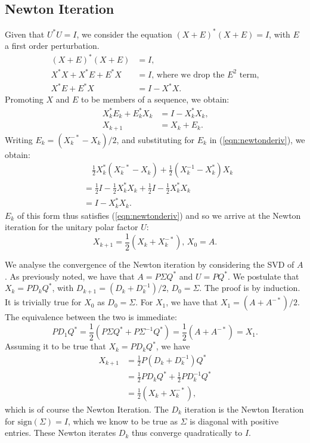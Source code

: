 \documentclass[12pt]{article}
\begin{document}
\subsection{Newton Iteration}
Given that $U^*U = I$, we consider the equation $(X+E)^*(X+E) = I$, with $E$ a
first order perturbation.
\begin{align*}
  (X+E)^*(X+E) & = I\text{, } \\
  X^*X + X^*E + E^*X & = I\text{, where we drop the } E^2 \text{ term,} \\
  X^*E + E^*X &  = I - X^*X\text{.} 
\end{align*}
Promoting $X$ and $E$ to be members of a sequence, we obtain:
\begin{align}\label{eqn:newtonderiv}
    X_k^*E_k + E_k^*X_k & = I - X_k^*X_k\text{,} \\
    X_{k+1} & = X_k + E_k\text{.}
\end{align}
Writing $E_k = (X_k^{-*} - X_k)/2$, and substituting for
$E_k$ in (\ref{eqn:newtonderiv}), we obtain:
\begin{align*}
  &\quad\frac{1}{2}X_k^*(X_k^{-*} - X_k) + \frac{1}{2}(X_k^{-1} - X_k^*)X_k \\
  &= \frac{1}{2}I - \frac{1}{2} X_k^*X_k + \frac{1}{2}I -  \frac{1}{2} X_k^*X_k  \\
  &= I - X_k^*X_k\text{.}
\end{align*}
$E_k$ of this form thus satisfies (\ref{eqn:newtonderiv}) and so we arrive
at the Newton iteration for the unitary polar factor $U$:
\begin{equation}\label{eqn:newton}
  X_{k+1} = \frac{1}{2}(X_k + X_{k}^{-*})\text{, } X_0 = A\text{.}
\end{equation}

We analyse the convergence of the Newton iteration by considering the SVD of $A$.
As previously noted, we have that $A=P\Sigma Q^*$ and $U=PQ^*$.
We postulate that $X_k = PD_kQ^*$, with $D_{k+1} = (D_k + D_k^{-1})/2$, $D_0 = \Sigma$.
The proof is by induction.
It is trivially true for $X_0$ as $D_0 = \Sigma$.
For $X_1$, we have that $X_1 = (A + A^{-*})/2$.
The equivalence between the two is immediate:
\begin{equation*}
  PD_1Q^* = \frac{1}{2}(P\Sigma Q^* + P\Sigma^{-1} Q^*) = \frac{1}{2}(A + A^{-*}) = X_1\text{.}
\end{equation*}
Assuming it to be true that $X_k = PD_kQ^*$, we have
\begin{align*}
  X_{k+1} & = \frac{1}{2}P(D_k + D_k^{-1})Q^* \\
          & = \frac{1}{2}PD_kQ^* + \frac{1}{2}PD_k^{-1}Q^* \\
          & = \frac{1}{2}(X_k + X_k^{-*})\text{, }
\end{align*}
which is of course the Newton Iteration. The $D_k$ iteration is the Newton
Iteration for $\mathrm{sign}(\Sigma) = I$, which we know to be true as $\Sigma$
is diagonal with positive entries. These Newton iterates $D_k$ thus converge
quadratically to $I$\cite[p.~113]{Higham:2008:FM}.
\end{document}
